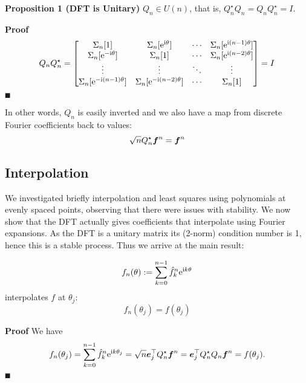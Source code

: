 \textbf{Proposition 1 (DFT is Unitary)} $Q_n \ensuremath{\in} U(n)$, that is, $Q_n^\ensuremath{\star} Q_n = Q_n Q_n^\ensuremath{\star} = I$.

\textbf{Proof}
\[
Q_n Q_n^\ensuremath{\star}  = \begin{bmatrix} \ensuremath{\Sigma}_n[1] & \ensuremath{\Sigma}_n[{\rm e}^{{\rm i} \ensuremath{\theta}}] & \ensuremath{\cdots} & \ensuremath{\Sigma}_n[{\rm e}^{{\rm i} (n-1) \ensuremath{\theta}}] \\
                            \ensuremath{\Sigma}_n[{\rm e}^{-{\rm i} \ensuremath{\theta}}] & \ensuremath{\Sigma}_n[1] & \ensuremath{\cdots} & \ensuremath{\Sigma}_n[{\rm e}^{{\rm i} (n-2) \ensuremath{\theta}}] \\
                            \ensuremath{\vdots} & \ensuremath{\vdots} & \ensuremath{\ddots} & \ensuremath{\vdots} \\
                            \ensuremath{\Sigma}_n[{\rm e}^{-{\rm i}(n-1) \ensuremath{\theta}}] & \ensuremath{\Sigma}_n[{\rm e}^{-{\rm i}(n-2) \ensuremath{\theta}}] & \ensuremath{\cdots} & \ensuremath{\Sigma}_n[1]
                            \end{bmatrix} = I
\]
\ensuremath{\QED}

In other words, $Q_n$ is easily inverted and we also have a map from discrete Fourier coefficients back to values:
\[
\sqrt{n} Q_n^\star {\mbox{\boldmath$f$\unboldmath}}^n = \bm{{\mbox{\boldmath$f$\unboldmath}}}^n
\]
\subsection{Interpolation}
We investigated briefly interpolation and least squares using polynomials at evenly spaced points, observing that there were issues with stability. We now show that the DFT actually gives coefficients that interpolate using Fourier expansions. As the DFT is a unitary matrix its (2-norm) condition number is 1, hence this is a stable process. Thus we arrive at the main result:

\begin{corollary}[Interpolation]
\[
f_n(\ensuremath{\theta}) := \ensuremath{\sum}_{k=0}^{n-1} \hat f_k^n {\rm e}^{{\rm i} k \ensuremath{\theta}}
\]
interpolates $f$ at $\ensuremath{\theta}_j$:
\[
f_n(\ensuremath{\theta}_j) = f(\ensuremath{\theta}_j)
\]
\end{corollary}
\textbf{Proof} We have
\[
f_n(\theta_j) = \sum_{k=0}^{n-1} \hat f_k^n {\rm e}^{{\rm i} k \theta_j} = \sqrt n \bm{{\mbox{\boldmath$e$\unboldmath}}}_j^\top Q_n^\star {\mbox{\boldmath$f$\unboldmath}}^n = \bm{{\mbox{\boldmath$e$\unboldmath}}}_j^\top Q_n^\star Q_n \bm{{\mbox{\boldmath$f$\unboldmath}}}^n = f(\theta_j).
\]
\ensuremath{\QED}


